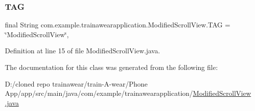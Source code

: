 \subsubsection{\texorpdfstring{TAG}{TAG}}
{\footnotesize\ttfamily final String com.\+example.\+trainawearapplication.\+Modified\+Scroll\+View.\+T\+AG = \char`\"{}Modified\+Scroll\+View\char`\"{}\hspace{0.3cm}{\ttfamily [static]}, {\ttfamily [private]}}



Definition at line 15 of file Modified\+Scroll\+View.\+java.



The documentation for this class was generated from the following file\+:\begin{DoxyCompactItemize}
\item 
D\+:/cloned repo trainawear/train-\/\+A-\/wear/\+Phone App/app/src/main/java/com/example/trainawearapplication/\mbox{\hyperlink{_modified_scroll_view_8java}{Modified\+Scroll\+View.\+java}}\end{DoxyCompactItemize}
